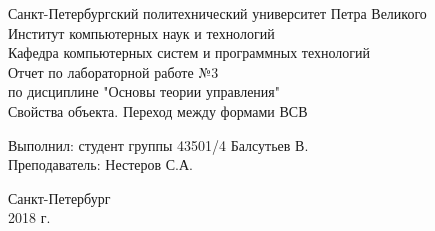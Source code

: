 	\begin{titlepage}
		\begin{center}
			Санкт-Петербургский политехнический университет Петра Великого\\
			Институт компьютерных наук и технологий\\
			Кафедра компьютерных систем и программных технологий\\
			\vspace{6cm}
			Отчет по лабораторной работе №3\\
			\vspace{0.2cm}	
			по дисциплине "Основы теории управления"\\
			\vspace{0.5cm}	
			\Large
			Свойства объекта. Переход между формами ВСВ
			\small
		\end{center}
		\vspace{5cm}
		\begin{flushright}
			Выполнил: студент группы 43501/4	Балсутьев В.\\
			\vspace{0.5cm}			
			Преподаватель: Нестеров С.А.\\
		\end{flushright}
		\vspace{7cm}
		\begin{center}
			Санкт-Петербург\\
			2018 г.\\
		\end{center}
	\end{titlepage}
	\newpage
